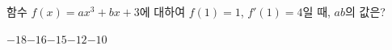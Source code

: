 함수 $f(x)=ax^3+bx+3$에 대하여 $f(1)=1$, $f'(1)=4$일 때, $ab$의 값은? 
\begin{choices32}{$-18$}{$-16$}{$-15$}{$-12$}{$-10$}\end{choices32}
